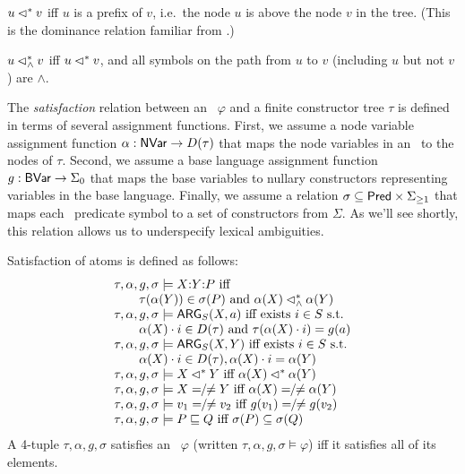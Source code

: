 \begin{definition}\label{defn:dominance}
  $u \lhd^* v$ iff $u$ is a prefix of $v$, i.e.\ the node $u$ is above
  the node $v$ in the tree.  (This is the dominance relation familiar
  from .)

  $u \lhd^*_\wedge v$ iff $u \lhd^* v$, and all symbols on the path from $u$
  to $v$ (including $u$ but not $v$) are $\wedge$.
\end{definition}

The {\em satisfaction} relation between an \rmrs\ $\varphi$ and a
finite constructor tree $\tau$ is defined in terms of several
assignment functions.  First, we assume a node variable assignment
function $\alpha: \mathsf{NVar} \rightarrow D(\tau)$ that maps the node
variables in an \rmrs\ to the nodes of $\tau$.  Second, we assume a
base language assignment function $g:\mathsf{BVar} \rightarrow \Sigma_0$ that
maps the base variables to nullary constructors
representing variables in the base language. Finally, we assume a
relation $\sigma \subseteq \mathsf{Pred} \times \Sigma_{\geq 1}$ that maps
each \rmrs\ predicate symbol to a set of constructors from $\Sigma$.
As we'll see shortly, this relation allows us to underspecify lexical
ambiguities.

\begin{definition}\label{defn:satisfaction}
Satisfaction of atoms is defined as follows:
$$
\begin{array}{l}
  \tau, \alpha, g, \sigma \models  \ep{X}{Y}{P}
\mbox{ iff}\\
\qquad \tau(\alpha(Y)) \in \sigma(P) \mbox{ and } \alpha(X) \wedgedom
  \alpha(Y) \\
  \tau, \alpha, g, \sigma \models \ARG_S(X,a)
\mbox{ iff exists  $i \in S$ s.t.}\\
\qquad  \alpha(X) \cdot i \in D(\tau) \mbox{ and }
  \tau(\alpha(X) \cdot 
  i) = g(a) \\
  \tau, \alpha, g, \sigma \models \ARG_S(X,Y)
\mbox{ iff  exists $i \in S$ s.t.}\\
\qquad \alpha(X) \cdot i \in D(\tau), \alpha(X) \cdot
  i = \alpha(Y)\\
  \tau, \alpha, g, \sigma \models X \dom Y
\mbox{ iff } \alpha(X) \dom \alpha(Y) \\
  \tau, \alpha, g, \sigma \models X =  \!\!/\!\! \neq Y
\mbox{ iff }  \alpha(X) =  \!\!/\!\! \neq \alpha(Y) \\
  \tau, \alpha, g, \sigma \models v_1 =  \!\!/\!\! \neq v_2
\mbox{ iff }  g(v_1) = \!\!/\!\! \neq g(v_2) \\
  \tau, \alpha, g, \sigma \models P \spec Q
\mbox{ iff $\sigma(P) \subseteq \sigma(Q)$}
\end{array}
$$
A 4-tuple $\tau,\alpha,g,\sigma$ satisfies an \rmrs\ $\varphi$
(written $\tau,\alpha,g,\sigma \models \varphi$) iff it satisfies all
of its elements.
\end{definition}

